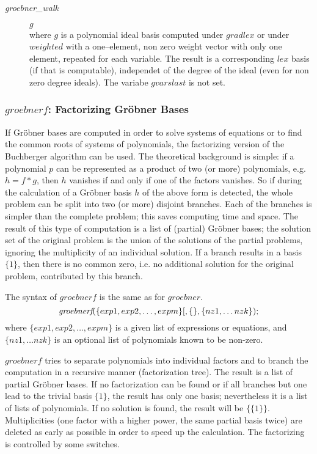 \begin{description}
\item[{\it groebner\_walk}] $g$\\
where $g$ is a polynomial ideal basis computed under $gradlex$ or under
$weighted$ with a one--element, non zero weight vector with only one
element, repeated for each variable. The result is a corresponding
$lex$ basis (if that is computable), independet of the degree of the
ideal (even for non zero degree ideals).
The variabe $gvarslast$ is not set.
\end{description}

\subsubsection{$groebnerf$: Factorizing Gr\"obner Bases}

If Gr\"obner bases are computed in order to solve systems of
equations or to find the common roots of systems of polynomials,
the factorizing version of the Buchberger algorithm can be used.
The theoretical background is simple: if a polynomial $p$ can be
represented as a product of two (or more) polynomials, e.g. $h= f*g$,
then $h$ vanishes if and only if one of the factors vanishes. So if
during the calculation of a Gr\"obner basis $h$ of the above form is
detected, the whole problem can be split into two (or more)
disjoint branches. Each of the branches is simpler than the complete
problem; this saves computing time and space. The result of this
type of computation is a list of (partial) Gr\"obner bases; the
solution set of the original problem is the union of the solutions of
the partial problems, ignoring the multiplicity of an individual
solution. If a branch results in a basis $\{1\}$, then there is no
common zero, i.e. no additional solution for the original problem,
contributed by this branch.

The syntax of $groebnerf$ is the same as for $groebner$.
\[ \mbox{\it groebnerf}(\{exp1, exp2, \ldots , expm\}
         [,\{\},\{nz1, \ldots nzk\}); \]
where $\{exp1, exp2, \ldots , expm\} $ is a given list of expressions or
equations, and $\{nz1, \ldots nzk\}$ is
an optional list of polynomials known to be non-zero.

$groebnerf$ tries to separate polynomials into individual factors and
to branch the computation in a recursive manner (factorization tree).
The result is a list of partial Gr\"obner bases. If no factorization can
be found or if all branches but one lead to the trivial basis $\{1\}$,
the result has only one basis; nevertheless it is a list of lists of
polynomials. If no solution is found, the result will be $\{\{1\}\}$.
Multiplicities (one factor with a higher power, the same partial basis
twice) are deleted as early as possible in order to speed up the
calculation. The factorizing is controlled by some switches.

